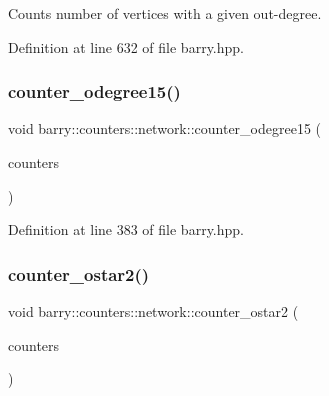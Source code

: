 Counts number of vertices with a given out-\/degree. 



Definition at line 632 of file barry.\+hpp.

\mbox{\label{namespacebarry_1_1counters_1_1network_af4ab196a242dd233010b342712fe0449}} 
\subsubsection{\texorpdfstring{counter\+\_\+odegree15()}{counter\_odegree15()}}
{\footnotesize\ttfamily void barry\+::counters\+::network\+::counter\+\_\+odegree15 (\begin{DoxyParamCaption}\item[{\hyperlink{namespacebarry_1_1counters_1_1network_aa72fdb34752ac24167a06ee196a8fff6}{Net\+Counters} $\ast$}]{counters }\end{DoxyParamCaption})\hspace{0.3cm}{\ttfamily [inline]}}



Definition at line 383 of file barry.\+hpp.

\mbox{\label{namespacebarry_1_1counters_1_1network_acbeff158b43d56c1fbf76f8c18891f9b}} 
\subsubsection{\texorpdfstring{counter\+\_\+ostar2()}{counter\_ostar2()}}
{\footnotesize\ttfamily void barry\+::counters\+::network\+::counter\+\_\+ostar2 (\begin{DoxyParamCaption}\item[{\hyperlink{namespacebarry_1_1counters_1_1network_aa72fdb34752ac24167a06ee196a8fff6}{Net\+Counters} $\ast$}]{counters }\end{DoxyParamCaption})\hspace{0.3cm}{\ttfamily [inline]}}



